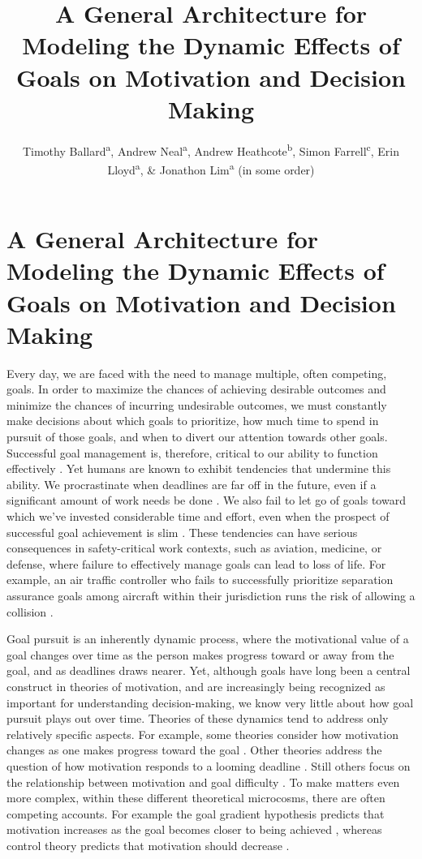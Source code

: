 \documentclass[a4paper,doc,natbib,donotrepeattitle]{apa6}
\title{A General Architecture for Modeling the Dynamic Effects of Goals on Motivation and Decision Making}
\author{Timothy Ballard\textsuperscript{a}, Andrew Neal\textsuperscript{a}, Andrew Heathcote\textsuperscript{b}, Simon Farrell\textsuperscript{c}, Erin Lloyd\textsuperscript{a}, \& Jonathon Lim\textsuperscript{a}  (in some order)}
\affiliation{
\textsuperscript{a}The University of Queensland \linebreak
\textsuperscript{b}University of Tasmania
\linebreak
\textsuperscript{b}University of Western Australia
}
\begin{document}
\maketitle

\section{A General Architecture for Modeling the Dynamic Effects of Goals on Motivation and Decision Making}

Every day, we are faced with the need to manage multiple, often competing, goals. In order to maximize the chances of achieving desirable outcomes and minimize the chances of incurring undesirable outcomes, we must constantly make decisions about which goals to prioritize, how much time to spend in pursuit of those goals, and when to divert our attention towards other goals. Successful goal management is, therefore, critical to our ability to function effectively \citep{Austin1996}. Yet humans are known to exhibit tendencies that undermine this ability. We procrastinate when deadlines are far off in the future, even if a significant amount of work needs be done \citep{Steel2006,Ariely2002}. We also fail to let go of goals toward which we've invested considerable time and effort, even when the prospect of successful goal achievement is slim \citep{Arkes1985,Olivola2018}. These tendencies can have serious consequences in safety-critical work contexts, such as aviation, medicine, or defense, where failure to effectively manage goals can lead to loss of life. For example, an air traffic controller who fails to successfully prioritize separation assurance goals among aircraft within their jurisdiction runs the risk of allowing a collision \citep{Hannah2014}.

Goal pursuit is an inherently dynamic process, where the motivational value of a goal changes over time as the person makes progress toward or away from the goal, and as deadlines draws nearer. Yet, although goals have long been a central construct in theories of motivation, and are increasingly being recognized as important for understanding decision-making, we know very little about how goal pursuit plays out over time. Theories of these dynamics tend to address only relatively specific aspects. For example, some theories consider how motivation changes as one makes progress toward the goal \citep{Carver1990,Bonezzi2011}. Other theories address the question of how motivation responds to a looming deadline \citep{Steel2006}. Still others focus on the relationship between motivation and goal difficulty \citep{Brehm1989,Wright2008}. To make matters even more complex, within these different theoretical microcosms, there are often competing accounts. For example the goal gradient hypothesis predicts that motivation increases as the goal becomes closer to being achieved \citep{Cryder2013,Hull1932}, whereas control theory predicts that motivation should decrease \citep{Carver1998,Powers1978}.
\end{document}
